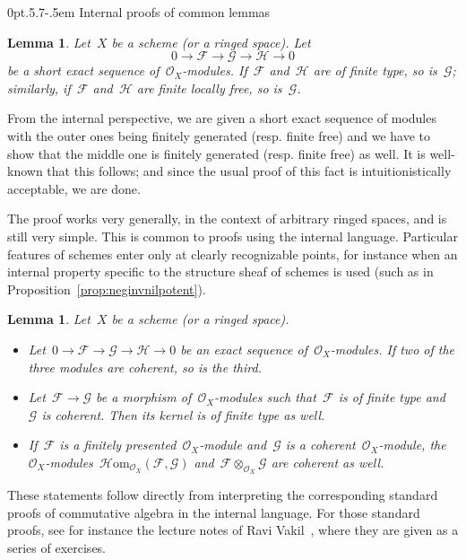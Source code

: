 \documentclass[10pt,reqno,a4paper]{amsbook}
\makeatletter
\theoremstyle{definition}
\theoremstyle{plain}
\newtheorem{lemma}[defn]{Lemma}
\theoremstyle{remark}
\newcommand{\F}{\mathcal{F}}
\renewcommand{\G}{\mathcal{G}}
\renewcommand{\H}{\mathcal{H}}
\renewcommand{\O}{\mathcal{O}}
\newcommand{\HOM}{\mathcal{H}\mathrm{om}}
\newcommand{\?}{\,{:}\,}
\renewcommand{\_}{\mathpunct{.}\,}
\newcommand{\lra}{\longrightarrow}
\newcommand{\resp}{resp.\@\xspace}
\renewenvironment{proof}[1][\proofname]{\par
  \pushQED{\qed}%
  \normalfont \topsep6\p@\@plus6\p@\relax
  \trivlist
  \item[\hskip\labelsep
        \itshape
    #1\@addpunct{.}]\ignorespaces
}{%
  \popQED\endtrivlist\@endpefalse
}
\def\subsection{\@startsection{subsection}{2}%
  {0pt}{.5\linespacing\@plus.7\linespacing}{-.5em}%
  {\normalfont\bfseries}}
\makeatother
\begin{document}
\subsection{Internal proofs of common lemmas}

\begin{lemma}Let~$X$ be a scheme (or a ringed space). Let
\[ 0 \lra \F \lra \G \lra \H \lra 0 \]
be a short exact sequence of~$\O_X$-modules. If~$\F$ and~$\H$ are of finite
type, so is~$\G$; similarly, if~$\F$ and~$\H$ are finite locally free, so
is~$\G$.
\end{lemma}
\begin{proof}From the internal perspective, we are given a short exact sequence
of modules with the outer ones being finitely generated (\resp finite free)
and we have to show that the middle one is finitely generated (\resp finite
free) as well. It is well-known that this follows; and since the usual proof of
this fact is intuitionistically acceptable, we are done.
\end{proof}

The proof works very generally, in the context of arbitrary ringed
spaces, and is still very simple. This is common to proofs using the internal
language. Particular features of schemes enter only at clearly recognizable
points, for instance when an internal property specific to the structure sheaf
of schemes is used (such as in Proposition~\ref{prop:neginvnilpotent}).

\begin{lemma}\label{lemma:coherent-stuff}
Let~$X$ be a scheme (or a ringed space).
\begin{itemize}
\item Let~$0 \to \F \to \G \to \H \to 0$ be an exact sequence
of~$\O_X$-modules. If two of the three modules are coherent, so is the third.
\item Let~$\F \to \G$ be a morphism of~$\O_X$-modules such that~$\F$ is
of finite type and~$\G$ is coherent. Then its kernel is of finite type as well.
\item If~$\F$ is a finitely presented~$\O_X$-module and~$\G$ is a
coherent~$\O_X$-module, the~$\O_X$-modules~$\HOM_{\O_X}(\F,\G)$ and~$\F \otimes_{\O_X} \G$
are coherent as well.
\end{itemize}
\end{lemma}
\begin{proof}These statements follow directly from interpreting the
corresponding standard proofs of commutative algebra in the internal language.
For those standard proofs, see for instance the lecture notes of Ravi
Vakil~\cite[Section~13.8]{vakil:foag}, where they are given as a series of
exercises.
\end{proof}
\end{document}
